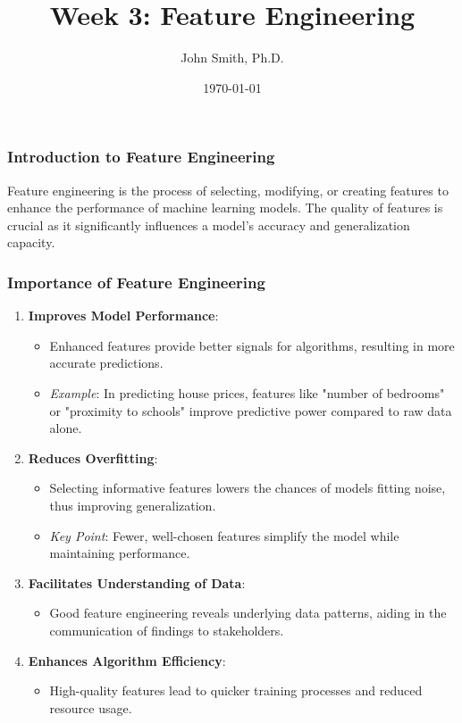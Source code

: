 \documentclass[aspectratio=169]{beamer}
\title[Feature Engineering]{Week 3: Feature Engineering}
\subtitle{}
\author[J. Smith]{John Smith, Ph.D.}
\institute[University Name]{
  Department of Computer Science\\
  University Name\\
  \vspace{0.3cm}
  Email: email@university.edu\\
  Website: www.university.edu
}
\date{\today}
\begin{document}
\frame{\titlepage}

\begin{frame}[fragile]
    \frametitle{Introduction to Feature Engineering}
    Feature engineering is the process of selecting, modifying, or creating features to enhance the performance of machine learning models. The quality of features is crucial as it significantly influences a model's accuracy and generalization capacity.
\end{frame}

\begin{frame}[fragile]
    \frametitle{Importance of Feature Engineering}
    \begin{enumerate}
        \item \textbf{Improves Model Performance}:
        \begin{itemize}
            \item Enhanced features provide better signals for algorithms, resulting in more accurate predictions.
            \item \textit{Example}: In predicting house prices, features like "number of bedrooms" or "proximity to schools" improve predictive power compared to raw data alone.
        \end{itemize}
        
        \item \textbf{Reduces Overfitting}:
        \begin{itemize}
            \item Selecting informative features lowers the chances of models fitting noise, thus improving generalization.
            \item \textit{Key Point}: Fewer, well-chosen features simplify the model while maintaining performance.
        \end{itemize}
        
        \item \textbf{Facilitates Understanding of Data}:
        \begin{itemize}
            \item Good feature engineering reveals underlying data patterns, aiding in the communication of findings to stakeholders.
        \end{itemize}
        
        \item \textbf{Enhances Algorithm Efficiency}:
        \begin{itemize}
            \item High-quality features lead to quicker training processes and reduced resource usage.
        \end{itemize}
    \end{enumerate}
\end{frame}
\end{document}
